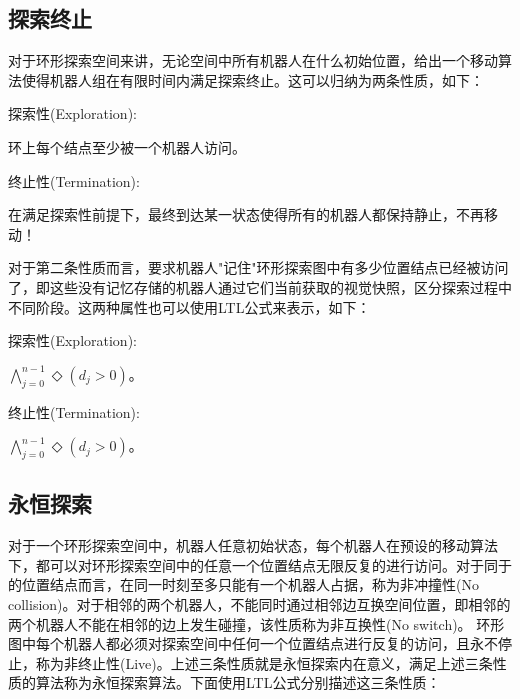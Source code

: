 \subsection{探索终止}
对于环形探索空间来讲，无论空间中所有机器人在什么初始位置，给出一个移动算法使得机器人组在有限时间内满足探索终止。这可以归纳为两条性质，如下：

\vspace{0.2cm}

\begin{bfseries}探索性(Exploration):\end{bfseries}环上每个结点至少被一个机器人访问。

\begin{bfseries}终止性(Termination):\end{bfseries}在满足探索性前提下，最终到达某一状态使得所有的机器人都保持静止，不再移动！

\vspace{0.2cm}

对于第二条性质而言，要求机器人"记住"环形探索图中有多少位置结点已经被访问了，即这些没有记忆存储的机器人通过它们当前获取的视觉快照，区分探索过程中不同阶段。这两种属性也可以使用LTL公式来表示，如下：

\vspace{0.2cm}

\begin{bfseries}探索性(Exploration):\end{bfseries}$\bigwedge_{j=0}^{n-1} \Diamond \left(d_j>0\right) $。

\begin{bfseries}终止性(Termination):\end{bfseries}$\bigwedge_{j=0}^{n-1} \Diamond \left(d_j>0\right)  $。

\vspace{0.2cm}

\subsection{永恒探索}
对于一个环形探索空间中，机器人任意初始状态，每个机器人在预设的移动算法下，都可以对环形探索空间中的任意一个位置结点无限反复的进行访问。对于同于的位置结点而言，在同一时刻至多只能有一个机器人占据，称为非冲撞性(No collision)。对于相邻的两个机器人，不能同时通过相邻边互换空间位置，即相邻的两个机器人不能在相邻的边上发生碰撞，该性质称为非互换性(No switch)。 环形图中每个机器人都必须对探索空间中任何一个位置结点进行反复的访问，且永不停止，称为非终止性(Live)。上述三条性质就是永恒探索内在意义，满足上述三条性质的算法称为永恒探索算法。下面使用LTL公式分别描述这三条性质：

